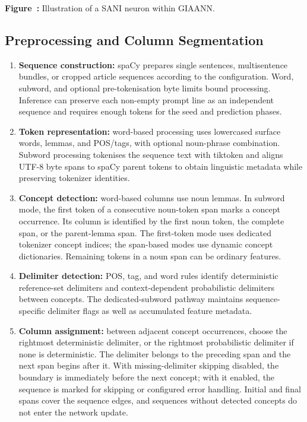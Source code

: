 \begin{center}

\par\smallskip
{}\label{fig:GIAANNSANIengine}
\textbf{Figure~\thefigure:} Illustration of a SANI neuron within GIAANN.
\end{center}

\subsection{Preprocessing and Column Segmentation}
\begin{enumerate}
	\item \textbf{Sequence construction:} spaCy prepares single sentences, multisentence bundles, or cropped article sequences according to the configuration. Word, subword, and optional pre-tokenisation byte limits bound processing. Inference can preserve each non-empty prompt line as an independent sequence and requires enough tokens for the seed and prediction phases.
	\item \textbf{Token representation:} word-based processing uses lowercased surface words, lemmas, and POS/tags, with optional noun-phrase combination. Subword processing tokenises the sequence text with tiktoken and aligns UTF-8 byte spans to spaCy parent tokens to obtain linguistic metadata while preserving tokenizer identities.
	\item \textbf{Concept detection:} word-based columns use noun lemmas. In subword mode, the first token of a consecutive noun-token span marks a concept occurrence. Its column is identified by the first noun token, the complete span, or the parent-lemma span. The first-token mode uses dedicated tokenizer concept indices; the span-based modes use dynamic concept dictionaries. Remaining tokens in a noun span can be ordinary features.
	\item \textbf{Delimiter detection:} POS, tag, and word rules identify deterministic reference-set delimiters and context-dependent probabilistic delimiters between concepts. The dedicated-subword pathway maintains sequence-specific delimiter flags as well as accumulated feature metadata.
	\item \textbf{Column assignment:} between adjacent concept occurrences, choose the rightmost deterministic delimiter, or the rightmost probabilistic delimiter if none is deterministic. The delimiter belongs to the preceding span and the next span begins after it. With missing-delimiter skipping disabled, the boundary is immediately before the next concept; with it enabled, the sequence is marked for skipping or configured error handling. Initial and final spans cover the sequence edges, and sequences without detected concepts do not enter the network update.
\end{enumerate}

